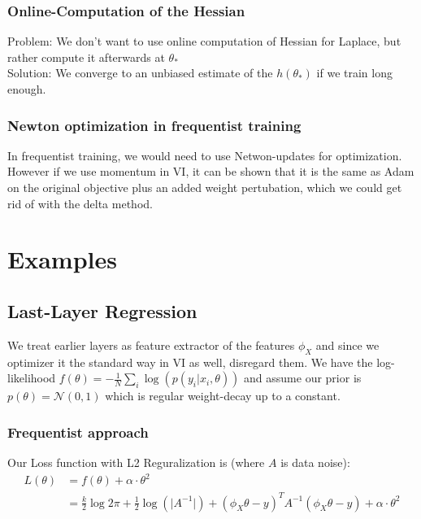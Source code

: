 \documentclass[a4paper]{scrartcl}
\begin{document}
    \subsubsection{Online-Computation of the Hessian}
      Problem: We don't want to use online computation of Hessian for Laplace,
      but rather compute it afterwards at $\theta_*$\\
      Solution: We converge to an unbiased estimate of the $h(\theta_*)$ if we
      train long enough.

    \subsubsection{Newton optimization in frequentist training}
      In frequentist training, we would need to use Netwon-updates for optimization.
      However if we use momentum in VI, it can be shown that it is the same as
      Adam on the original objective plus an added weight pertubation, which we
      could get rid of with the delta method.



\section{Examples}

\subsection{Last-Layer Regression}
  We treat earlier layers as feature extractor of the features $\phi_X$ and
  since we optimizer it the standard way in VI as well, disregard them. We have
  the log-likelihood $f(\theta) = - \frac{1}{N} \sum_i \log(p(y_i \vert x_i,
  \theta))$ and assume our prior is $p(\theta) = \mathcal{N}(0, 1)$ which is
  regular weight-decay up to a constant.

  \subsubsection{Frequentist approach}
    Our Loss function with L2 Reguralization is (where $A$ is data noise):
    \begin{align*}
      L(\theta) &= f(\theta) + \alpha \cdot \theta^2 \\
      &= \frac{k}{2}\log{2\pi} + \frac{1}{2} \log(\vert A^{-1} \vert) + (\phi_{X}\theta - y)^T A^{-1} (\phi_{X}\theta - y) + \alpha \cdot \theta^2\\
    \end{align*}
\end{document}

